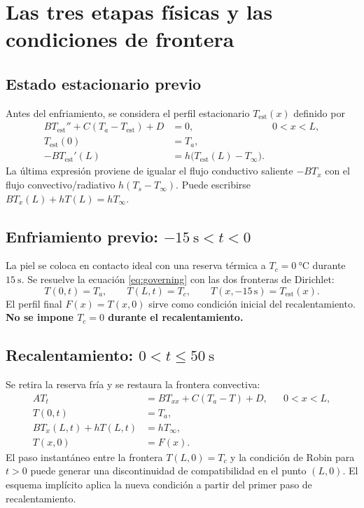 \documentclass[11pt,a4paper]{article}
\begin{document}
\section{Las tres etapas físicas y las condiciones de frontera}
\subsection{Estado estacionario previo}
Antes del enfriamiento, se considera el perfil estacionario $T_{\mathrm{est}}(x)$ definido por
\begin{subequations}\label{eq:steady}
\begin{align}
 B T_{\mathrm{est}}''+C(T_a-T_{\mathrm{est}})+D&=0, &0<x<L,\\
 T_{\mathrm{est}}(0)&=T_a,\\
 -B T_{\mathrm{est}}'(L)&=h\bigl(T_{\mathrm{est}}(L)-T_\infty\bigr).
\end{align}
\end{subequations}
La última expresión proviene de igualar el flujo conductivo saliente $-B T_x$ con el flujo convectivo/radiativo $h(T_s-T_\infty)$. Puede escribirse $B T_x(L)+hT(L)=hT_\infty$.

\subsection{Enfriamiento previo: $-\SI{15}{\second}<t<0$}
La piel se coloca en contacto ideal con una reserva térmica a $T_c=\SI{0}{\celsius}$ durante $\SI{15}{\second}$. Se resuelve la ecuación \eqref{eq:governing} con las dos fronteras de Dirichlet:
\begin{equation}
T(0,t)=T_a,\qquad T(L,t)=T_c,\qquad
T(x,-15\,\mathrm{s})=T_{\mathrm{est}}(x).
\end{equation}
El perfil final $F(x)=T(x,0)$ sirve como condición inicial del recalentamiento. \textbf{No se impone $T_c=0$ durante el recalentamiento.}

\subsection{Recalentamiento: $0<t\le \SI{50}{\second}$}
Se retira la reserva fría y se restaura la frontera convectiva:
\begin{subequations}\label{eq:reheat}
\begin{align}
 A T_t &= B T_{xx}+C(T_a-T)+D,&&0<x<L,\\
 T(0,t)&=T_a,\\
 B T_x(L,t)+hT(L,t)&=hT_\infty,\\
 T(x,0)&=F(x).
\end{align}
\end{subequations}
El paso instantáneo entre la frontera $T(L,0)=T_c$ y la condición de Robin para $t>0$ puede generar una discontinuidad de compatibilidad en el punto $(L,0)$. El esquema implícito aplica la nueva condición a partir del primer paso de recalentamiento.
\end{document}
